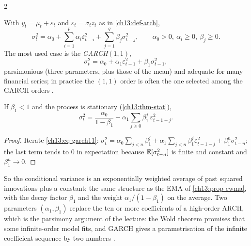 \begin{paracol}{2}
\begin{definition}[GARCH$(p,q)$]\label{ch13:def-garch}
With $y_t=\mu_t+\varepsilon_t$ and $\varepsilon_t=\sigma_tz_t$ as in \cref{ch13:def-arch},
\begin{equation}\label{ch13:eq-garch}
  \sigma_t^2=\alpha_0+\sum_{i=1}^p\alpha_i\varepsilon_{t-i}^2+\sum_{j=1}^q\beta_j\sigma_{t-j}^2,\qquad\alpha_0>0,\ \alpha_i\ge0,\ \beta_j\ge0 .
\end{equation}
The most used case is the \emph{GARCH$(1,1)$},
\begin{equation}\label{ch13:eq-garch11}
  \sigma_t^2=\alpha_0+\alpha_1\varepsilon_{t-1}^2+\beta_1\sigma_{t-1}^2 ,
\end{equation}
parsimonious (three parameters, plus those of the mean) and adequate for many financial series; in practice the $(1,1)$ order is often the one selected among the GARCH orders
.
\end{definition}

\begin{proposition}\label{ch13:prop-archinf}
If $\beta_1<1$ and the process is stationary (\cref{ch13:thm-stat}),
\[
  \sigma_t^2=\frac{\alpha_0}{1-\beta_1}+\alpha_1\sum_{j\ge0}\beta_1^j\,\varepsilon_{t-1-j}^2 .
\]
\end{proposition}
\begin{proof}
Iterate \eqref{ch13:eq-garch11}: $\sigma_t^2=\alpha_0\sum_{j<n}\beta_1^j+\alpha_1\sum_{j<n}\beta_1^j\varepsilon^2_{t-1-j}+\beta_1^n\sigma^2_{t-n}$; the last term tends to $0$ in expectation
because $\mathbb{E}[\sigma^2_{t-n}]$ is finite and constant and $\beta_1^n\to0$.
\end{proof}
So the conditional variance is an exponentially weighted average of past squared innovations plus a constant: the same structure as the EMA of
\cref{ch13:prop-ewma}, with the decay factor $\beta_1$ and the weight $\alpha_1/(1-\beta_1)$ on the average. Two parameters $(\alpha_1,\beta_1)$ replace the ten or more coefficients of a high-order ARCH,
which is the parsimony argument of the lecture: the Wold theorem promises that some infinite-order model fits, and GARCH gives a parametrisation of the infinite coefficient sequence by two numbers
.


\end{paracol}
